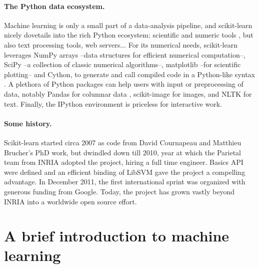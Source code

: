 \documentclass[a4paper]{article}
\begin{document}
\paragraph{The Python data ecosystem.}
%
Machine learning is only a small part of a data-analysis pipeline, and
scikit-learn nicely dovetails into the rich Python ecosystem: scientific
and numeric tools \cite{oliphant2007python,varoquaux2013scipy}, but also
text processing tools, web servers...
%
For its numerical needs, scikit-learn leverages NumPy arrays
\cite{vanderwalt2011} --data structures for efficient numerical
computation--, SciPy --a collection of classic numerical algorithms--,
matplotlib \cite{hunter2007matplotlib} --for scientific plotting-- and
Cython, to generate and call compiled code in a Python-like syntax
\cite{behnel2011cython}.
%
A plethora of Python packages can help users with input or preprocessing
of data, notably Pandas for columnar data \cite{mckinney2012}, scikit-image
for images, and NLTK for text. Finally, the IPython environment
\cite{perez2007ipython} is priceless for interactive work.

\paragraph{Some history.}
%
Scikit-learn started circa 2007 as code from David Cournapeau and
Matthieu Brucher's PhD work, but dwindled down till 2010, year at which the
Parietal team from INRIA adopted the project, hiring a full time
engineer. Basics API were defined and an efficient binding of LibSVM
\cite{chang2011libsvm} gave the project a compelling advantage. In
December 2011, the first international sprint was organized with generous
funding from Google. Today, the project has grown vastly beyond
INRIA into a worldwide open source effort.

\section{A brief introduction to machine learning}
\end{document}
